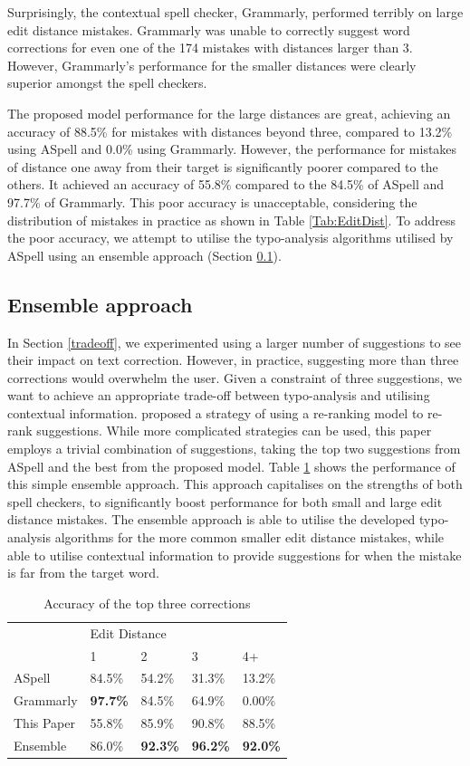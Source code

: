 \documentclass[11pt,a4paper]{article}
\begin{document}
Surprisingly, the contextual spell checker, Grammarly, performed terribly on large edit distance mistakes. Grammarly was unable to correctly suggest word corrections for even one of the 174 mistakes with distances larger than 3. However, Grammarly's performance for the smaller distances were clearly superior amongst the spell checkers. 

The proposed model performance for the large distances are great, achieving an accuracy of 88.5\% for mistakes with distances beyond three, compared to 13.2\% using ASpell and 0.0\% using Grammarly. However, the performance for mistakes of distance one away from their target is significantly poorer compared to the others. It achieved an accuracy of 55.8\% compared to the 84.5\% of ASpell and 97.7\% of Grammarly. This poor accuracy is unacceptable, considering the distribution of mistakes in practice as shown in Table \ref{Tab:EditDist}. To address the poor accuracy, we attempt to utilise the typo-analysis algorithms utilised by ASpell using an ensemble approach (Section \ref{ensemble}).

\subsection{Ensemble approach}\label{ensemble}
In Section \ref{tradeoff}, we experimented using a larger number of suggestions to see their impact on text correction. However, in practice, suggesting more than three corrections would overwhelm the user. Given a constraint of three suggestions, we want to achieve an appropriate trade-off between typo-analysis and utilising contextual information. \citet{reranking} proposed a strategy of using a re-ranking model to re-rank suggestions. While more complicated strategies can be used, this paper employs a trivial combination of suggestions, taking the top two suggestions from ASpell and the best from the proposed model. Table \ref{Tab:rerank} shows the performance of this simple ensemble approach. This approach capitalises on the strengths of both spell checkers, to significantly boost performance for both small and large edit distance mistakes. The ensemble approach is able to utilise the developed typo-analysis algorithms for the more common smaller edit distance mistakes, while able to utilise contextual information to provide suggestions for when the mistake is far from the target word.  

\begin{table}[H]		
\caption{Accuracy of the top three corrections}
\begin{tabular}{l|llll}
           & \multicolumn{4}{l}{Edit Distance} \\ \cline{2-5} 
           & 1      & 2      & 3      & 4+     \\ \hline
ASpell     & 84.5\% & 54.2\% & 31.3\% & 13.2\% \\
Grammarly  & \textbf{97.7\%} & 84.5\% & 64.9\% & 0.00\%  \\
This Paper & 55.8\% & 85.9\% & 90.8\% & 88.5\% \\
Ensemble   & 86.0\% & \textbf{92.3\%} & \textbf{96.2\%} & \textbf{92.0\%}
\end{tabular}
\label{Tab:rerank}   
\end{table}
\end{document}
